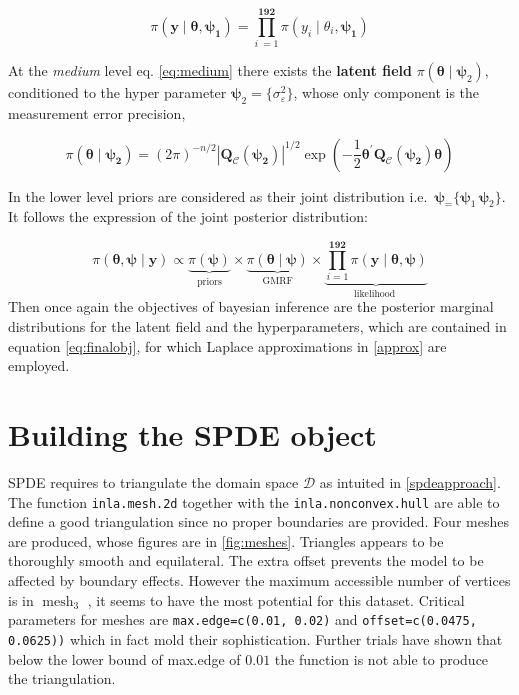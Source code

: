\documentclass[
  12pt,
  a4paper,
  oneside]{book}
\newcommand{\passthrough}[1]{#1}
\theoremstyle{definition}
\theoremstyle{definition}
\theoremstyle{definition}
\theoremstyle{remark}
\begin{document}
\[\pi(\boldsymbol{\mathbf{y}} \mid \boldsymbol{\theta}, \boldsymbol{\psi_1})=\prod_{i\ = 1}^{\mathbf{192}} \pi\left(y_{i} \mid \theta_{i}, \boldsymbol{\psi_1}\right)\]

At the \emph{medium} level eq. \eqref{eq:medium} there exists the \textbf{latent field} \(\pi(\boldsymbol{\theta} \mid \boldsymbol\psi_2)\), conditioned to the hyper parameter \(\boldsymbol\psi_2 = \{\sigma_{\varepsilon}^2\}\), whose only component is the measurement error precision,

\[  \pi(\boldsymbol{\theta} \mid \boldsymbol{\psi_2})=(2 \pi)^{-n / 2}| \boldsymbol{Q_{\mathscr{C}}(\psi_2)}|^{1 / 2} \exp \left(-\frac{1}{2} \boldsymbol{\theta}^{\prime} \boldsymbol{Q_{\mathscr{C}}(\psi_2)} \boldsymbol{\theta}\right)\]

In the lower level priors are considered as their joint distribution i.e.~\(\boldsymbol\psi_ =\{ \boldsymbol\psi_1\, \boldsymbol\psi_2\}\). It follows the expression of the joint posterior distribution:

\[
\pi(\boldsymbol{\theta}, \boldsymbol{\psi} \mid \mathbf{y})\propto  \underbrace{\pi(\boldsymbol{\psi})}_{\text {priors}} \times \underbrace{\pi(\boldsymbol\theta \mid \boldsymbol\psi)}_{\text {GMRF}} \times \underbrace{\prod_{i=1}^{\mathbf{192}} \pi\left(\mathbf{y} \mid \boldsymbol\theta, \boldsymbol{\psi}\right)}_{\text {likelihood }}
\]
Then once again the objectives of bayesian inference are the posterior marginal distributions for the latent field and the hyperparameters, which are contained in equation \eqref{eq:finalobj}, for which Laplace approximations in \ref{approx} are employed.

\hypertarget{spdemodeol}{%
\section{Building the SPDE object}\label{spdemodeol}}

SPDE requires to triangulate the domain space \(\mathscr{D}\) as intuited in \ref{spdeapproach}. The function \passthrough{\lstinline!inla.mesh.2d!} together with the \passthrough{\lstinline!inla.nonconvex.hull!} are able to define a good triangulation since no proper boundaries are provided. Four meshes are produced, whose figures are in \ref{fig:meshes}. Triangles appears to be thoroughly smooth and equilateral. The extra offset prevents the model to be affected by boundary effects. However the maximum accessible number of vertices is in \(\operatorname{mesh}_3\) , it seems to have the most potential for this dataset. Critical parameters for meshes are \passthrough{\lstinline!max.edge=c(0.01, 0.02)!} and \passthrough{\lstinline!offset=c(0.0475, 0.0625))!} which in fact mold their sophistication. Further trials have shown that below the lower bound of max.edge of \(0.01\) the function is not able to produce the triangulation.
\end{document}
